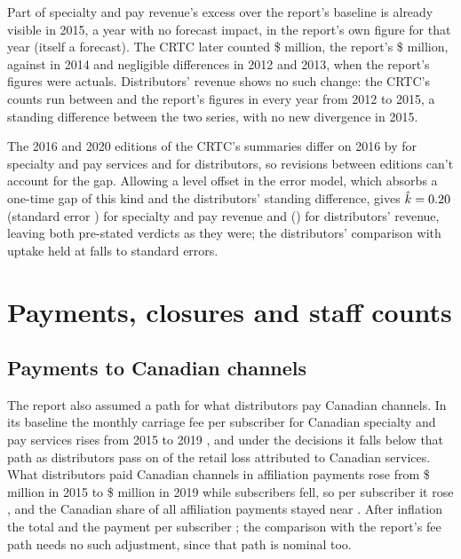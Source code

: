 Part of specialty and pay revenue's excess over the report's baseline is already visible in 2015, a year with no forecast impact, in the report's own figure for that year (itself a forecast). The CRTC later counted \$\lttvCRTCFifteenSpec{} million, \lttvGapFifteenSpec{} \lttvGapFifteenSpecDir{} the report's \$\lttvReportFifteenSpec{} million, against \lttvGapFourteenSpec{} in 2014 and negligible differences in 2012 and 2013, when the report's figures were actuals. Distributors' revenue shows no such change: the CRTC's counts run between \lttvGapRangeLoBDU{} and \lttvGapRangeHiBDU{} \lttvGapFifteenBDUDir{} the report's figures in every year from 2012 to 2015, a standing difference between the two series, with no new divergence in 2015.

The 2016 and 2020 editions of the CRTC's summaries differ on 2016 by \lttvReleaseGapSpec{} for specialty and pay services and \lttvReleaseGapBDU{} for distributors, so revisions between editions can't account for the gap. Allowing a level offset in the error model, which absorbs a one-time gap of this kind and the distributors' standing difference, gives \(\hat k=0.20\) (standard error \lttvKSpecOffsetSE{}) for specialty and pay revenue and \lttvKBDUOffset{} (\lttvKBDUOffsetSE{}) for distributors' revenue, leaving both pre-stated verdicts as they were; the distributors' comparison with uptake held at \lttvUptakeJuneShare{} falls to \lttvBDUGapSEsOffset{} standard errors.

\section{Payments, closures and staff counts}
\label{sec:lttv-links}

\subsection{Payments to Canadian channels}

The report also assumed a path for what distributors pay Canadian channels. In its baseline the monthly carriage fee per subscriber for Canadian specialty and pay services rises \lttvBaseFeeGrowth{} from 2015 to 2019 \citep[Table~14, p.~67]{nordicity2015television}, and under the decisions it falls below that path as distributors pass on \lttvReportPassThrough{} of the retail loss attributed to Canadian services. What distributors paid Canadian channels in affiliation payments rose from \$\lttvPayCanFifteen{} million in 2015 to \$\lttvPayCanNineteen{} million in 2019 while subscribers fell, so per subscriber it rose \lttvPerSubGrowth{}, and the Canadian share of all affiliation payments stayed near \lttvPayShareFifteen{} \citep[Table~U-T11]{crtc2019cmrbdu}. After inflation the total \lttvPayCanRealDir{} \lttvPayCanRealChange{} and the payment per subscriber \lttvPerSubRealDir{} \lttvPerSubRealChange{}; the comparison with the report's fee path needs no such adjustment, since that path is nominal too.

